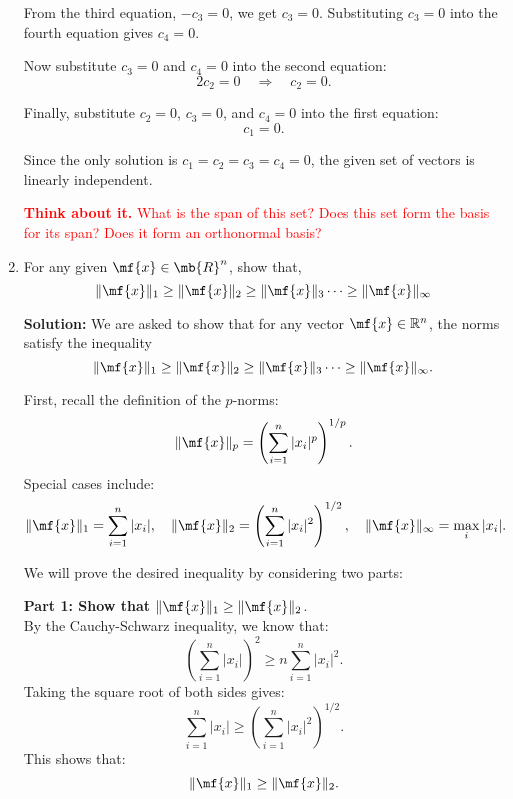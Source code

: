 \begin{enumerate}
\begin{boxedstuff}
        From the third equation, $-c_3 = 0$, we get $c_3 = 0$. Substituting $c_3 = 0$ into the fourth equation gives $c_4 = 0$.

        Now substitute $c_3 = 0$ and $c_4 = 0$ into the second equation:
        \[
        2c_2 = 0 \quad \Rightarrow \quad c_2 = 0.
        \]

        Finally, substitute $c_2 = 0$, $c_3 = 0$, and $c_4 = 0$ into the first equation:
        \[
        c_1 = 0.
        \]

        Since the only solution is $c_1 = c_2 = c_3 = c_4 = 0$, the given set of vectors is linearly independent.

        \textcolor{red}{\textbf{Think about it.} What is the span of this set? Does this set form the basis for its span? Does it form an orthonormal basis?}
    \end{boxedstuff}

    \item For any given $\mf{x} \in \mb{R}^n$, show that,
    $$ \Vert \mf{x} \Vert_1 \geq \Vert \mf{x} \Vert_2 \geq \Vert \mf{x} \Vert_3 \cdots \geq \Vert \mf{x} \Vert_\infty $$

    \begin{boxedstuff}
        \vspace{4mm}
        \textbf{Solution:} We are asked to show that for any vector $\mf{x} \in \mathbb{R}^n$, the norms satisfy the inequality
        \[
        \Vert \mf{x} \Vert_1 \geq \Vert \mf{x} \Vert_2 \geq \Vert \mf{x} \Vert_3 \cdots \geq \Vert \mf{x} \Vert_\infty.
        \]
        
        First, recall the definition of the $p$-norms:
        \[
        \Vert \mf{x} \Vert_p = \left( \sum_{i=1}^n |x_i|^p \right)^{1/p}.
        \]
        Special cases include:
        \[
        \Vert \mf{x} \Vert_1 = \sum_{i=1}^n |x_i|, \quad \Vert \mf{x} \Vert_2 = \left( \sum_{i=1}^n |x_i|^2 \right)^{1/2}, \quad \Vert \mf{x} \Vert_\infty = \max_{i} |x_i|.
        \]

        We will prove the desired inequality by considering two parts:

        \textbf{Part 1: Show that} $\Vert \mf{x} \Vert_1 \geq \Vert \mf{x} \Vert_2$. \\
        By the Cauchy-Schwarz inequality, we know that:
        \[
        \left( \sum_{i=1}^n |x_i| \right)^2 \geq n \sum_{i=1}^n |x_i|^2.
        \]
        Taking the square root of both sides gives:
        \[
        \sum_{i=1}^n |x_i| \geq \left( \sum_{i=1}^n |x_i|^2 \right)^{1/2}.
        \]
        This shows that:
        \[
        \Vert \mf{x} \Vert_1 \geq \Vert \mf{x} \Vert_2.
        \]


\end{boxedstuff}
\end{enumerate}
